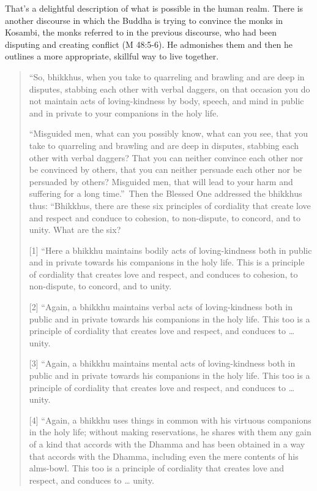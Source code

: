 That’s a delightful description of what is possible in the human realm.
There is another discourse in which the Buddha is trying to convince the
monks in Kosambi, the monks referred to in the previous discourse, who
had been disputing and creating conflict (M 48:5-6). He admonishes them
and then he outlines a more appropriate, skillful way to live together.

\begin{quotation}
“So, bhikkhus, when you take to quarreling and brawling and are deep in
disputes, stabbing each other with verbal daggers, on that occasion you
do not maintain acts of loving-kindness by body, speech, and mind in
public and in private to your companions in the holy life.

“Misguided men, what can you possibly know, what can you see, that you
take to quarreling and brawling and are deep in disputes, stabbing each
other with verbal daggers? That you can neither convince each other nor
be convinced by others, that you can neither persuade each other nor be
persuaded by others? Misguided men, that will lead to your harm and
suffering for a long time.”~Then the Blessed One addressed the bhikkhus
thus: “Bhikkhus, there are these six principles of cordiality that
create love and respect and conduce to cohesion, to non-dispute, to
concord, and to unity. What are the six?

{[}1{]} “Here a bhikkhu maintains bodily acts of loving-kindness both in
public and in private towards his companions in the holy life. This is a
principle of cordiality that creates love and respect, and conduces to
cohesion, to non-dispute, to concord, and to unity.

{[}2{]} “Again, a bhikkhu maintains verbal acts of loving-kindness both
in public and in private towards his companions in the holy life. This
too is a principle of cordiality that creates love and respect, and
conduces to \ldots{} unity.

{[}3{]} “Again, a bhikkhu maintains mental acts of loving-kindness both
in public and in private towards his companions in the holy life. This
too is a principle of cordiality that creates love and respect, and
conduces to \ldots{} unity.

{[}4{]} “Again, a bhikkhu uses things in common with his virtuous
companions in the holy life; without making reservations, he shares with
them any gain of a kind that accords with the Dhamma and has been
obtained in a way that accords with the Dhamma, including even the mere
contents of his alms-bowl. This too is a principle of cordiality that
creates love and respect, and conduces to \ldots{} unity.


\end{quotation}
